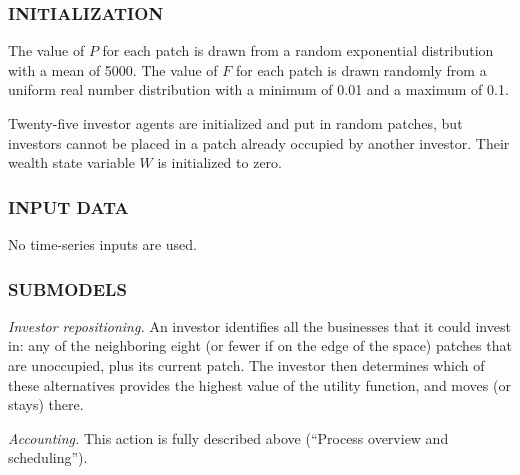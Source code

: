 \documentclass[]{article}
\begin{document}
\hypertarget{initialization}{%
\subsubsection{INITIALIZATION}\label{initialization}}

The value of \(P\) for each patch is drawn from a random exponential
distribution with a mean of 5000. The value of \(F\) for each patch
is drawn randomly from a uniform real number distribution with a minimum
of 0.01 and a maximum of 0.1.

Twenty-five investor agents are initialized and put in random patches,
but investors cannot be placed in a patch already occupied by another
investor. Their wealth state variable \(W\) is initialized to zero.

\hypertarget{input-data}{%
\subsubsection{INPUT DATA}\label{input-data}}

No time-series inputs are used.

\hypertarget{submodels}{%
\subsubsection{SUBMODELS}\label{submodels}}

\emph{Investor repositioning.} An investor identifies all the businesses
that it could invest in: any of the neighboring eight (or fewer if on
the edge of the space) patches that are unoccupied, plus its current
patch. The investor then determines which of these alternatives provides
the highest value of the utility function, and moves (or stays) there.

\emph{Accounting.} This action is fully described above (``Process
overview and scheduling'').
\end{document}

